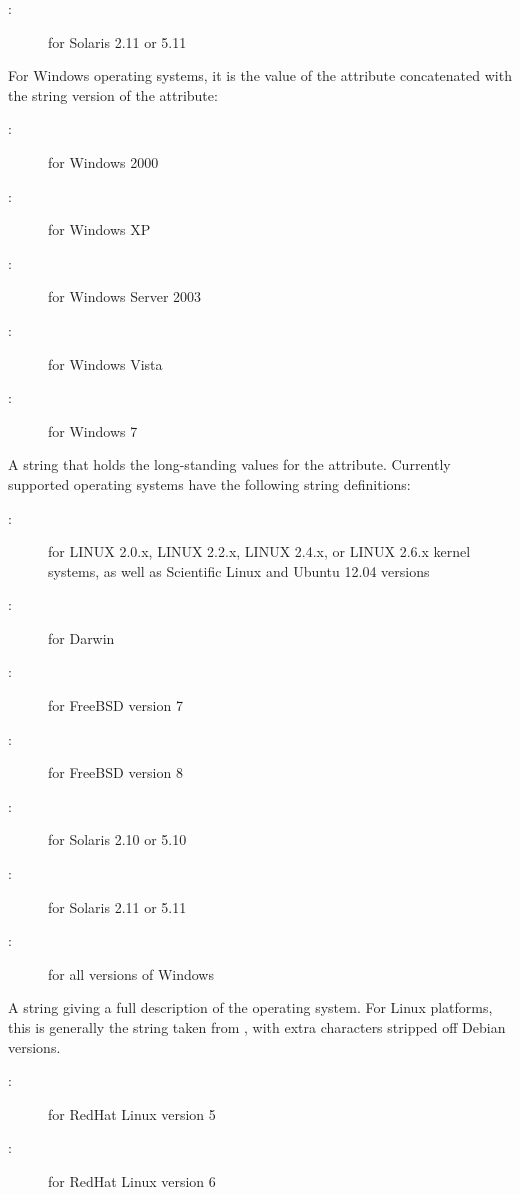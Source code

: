 \begin{description}
\begin{description}
	\item[:] for Solaris 2.11 or 5.11
	\end{description}
For Windows operating systems, it is the value of the  attribute 
concatenated with the string version of the  attribute:
	\begin{description}
	\item[:] for Windows 2000
	\item[:] for Windows XP
	\item[:] for Windows Server 2003
	\item[:] for Windows Vista
	\item[:] for Windows 7
	\end{description}
%
\item[\AdAttr{OpSysLegacy}:] A string that holds the long-standing values for the  attribute.
Currently supported operating systems have the following string
definitions:
	\begin{description}
	\item[:] for LINUX 2.0.x, LINUX 2.2.x, LINUX 2.4.x, or LINUX 2.6.x kernel systems, as well as Scientific Linux and  Ubuntu 12.04 versions
	\item[:] for Darwin
	\item[:] for FreeBSD version 7
	\item[:] for FreeBSD version 8
	\item[:] for Solaris 2.10 or 5.10
	\item[:] for Solaris 2.11 or 5.11
	\item[:] for all versions of Windows
	\end{description}
%
\item[\AdAttr{OpSysLongName}:] A string giving a full description of 
the operating system.
For Linux platforms, this is generally the string taken from ,
with extra characters stripped off Debian versions.
	\begin{description}
	\item[:] for RedHat Linux version 5
	\item[:] for RedHat Linux version 6

\end{description}
\end{description}

